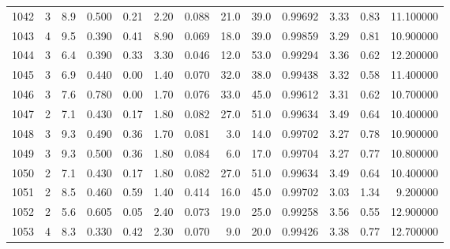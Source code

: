 \begin{tabular}{lrrrrrrrrrrrr}
1042 &        3 &            8.9 &             0.500 &         0.21 &            2.20 &      0.088 &                 21.0 &                  39.0 &  0.99692 &  3.33 &       0.83 &  11.100000 \\
1043 &        4 &            9.5 &             0.390 &         0.41 &            8.90 &      0.069 &                 18.0 &                  39.0 &  0.99859 &  3.29 &       0.81 &  10.900000 \\
1044 &        3 &            6.4 &             0.390 &         0.33 &            3.30 &      0.046 &                 12.0 &                  53.0 &  0.99294 &  3.36 &       0.62 &  12.200000 \\
1045 &        3 &            6.9 &             0.440 &         0.00 &            1.40 &      0.070 &                 32.0 &                  38.0 &  0.99438 &  3.32 &       0.58 &  11.400000 \\
1046 &        3 &            7.6 &             0.780 &         0.00 &            1.70 &      0.076 &                 33.0 &                  45.0 &  0.99612 &  3.31 &       0.62 &  10.700000 \\
1047 &        2 &            7.1 &             0.430 &         0.17 &            1.80 &      0.082 &                 27.0 &                  51.0 &  0.99634 &  3.49 &       0.64 &  10.400000 \\
1048 &        3 &            9.3 &             0.490 &         0.36 &            1.70 &      0.081 &                  3.0 &                  14.0 &  0.99702 &  3.27 &       0.78 &  10.900000 \\
1049 &        3 &            9.3 &             0.500 &         0.36 &            1.80 &      0.084 &                  6.0 &                  17.0 &  0.99704 &  3.27 &       0.77 &  10.800000 \\
1050 &        2 &            7.1 &             0.430 &         0.17 &            1.80 &      0.082 &                 27.0 &                  51.0 &  0.99634 &  3.49 &       0.64 &  10.400000 \\
1051 &        2 &            8.5 &             0.460 &         0.59 &            1.40 &      0.414 &                 16.0 &                  45.0 &  0.99702 &  3.03 &       1.34 &   9.200000 \\
1052 &        2 &            5.6 &             0.605 &         0.05 &            2.40 &      0.073 &                 19.0 &                  25.0 &  0.99258 &  3.56 &       0.55 &  12.900000 \\
1053 &        4 &            8.3 &             0.330 &         0.42 &            2.30 &      0.070 &                  9.0 &                  20.0 &  0.99426 &  3.38 &       0.77 &  12.700000 \\

\end{tabular}
